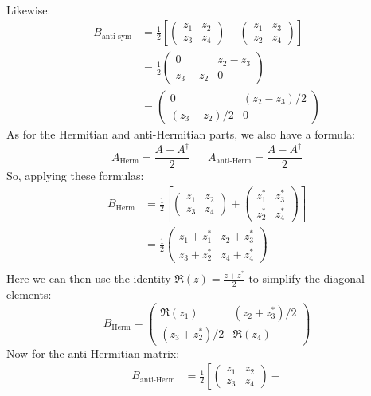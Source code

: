 \documentclass{article}
\begin{document}
\begin{solution}
\begin{align*}
	\end{align*} 
	Likewise: 
	\begin{align*}
		B_{\text{anti-sym}} &= \frac{1}{2}\left[ \begin{pmatrix} z_1 & z_2\\ z_3 & z_4 \end{pmatrix} -
		\begin{pmatrix} z_1 & z_3 \\ z_2 & z_4 \end{pmatrix}\right] \\
							&= \frac{1}{2}\begin{pmatrix} 0 & z_2 - z_3\\ z_3 - z_2& 0 \end{pmatrix}  \\
							&= \begin{pmatrix} 0 & (z_2 - z_3) / 2 \\ (z_3 - z_2) / 2 & 0\end{pmatrix}
	\end{align*}
	As for the Hermitian and anti-Hermitian parts, we also have a formula: 
	\[
		A_{\text{Herm}} = \frac{A + A^\dagger}{2} \phantom{aaa} A_{\text{anti-Herm}} = \frac{A - A^\dagger}{2}
	\] 
	So, applying these formulas:
	\begin{align*}
		B_{\text{Herm}} &= \frac{1}{2}\left[\begin{pmatrix} z_1&z_2\\z_3 & z_4 \end{pmatrix} + 
		\begin{pmatrix} z_1^* & z_3^*\\ z_2^* & z_4^* \end{pmatrix}\right]  \\
			&= \frac{1}{2}\begin{pmatrix} z_1 + z_1^* & z_2 + z_3^*\\ z_3 + z_2^* & z_4 + z_4^* \end{pmatrix}  \\
	\end{align*} 
	Here we can then use the identity $\Re(z) = \frac{z + z^*}{2}$ to simplify the diagonal elements:
	\[
		B_{\text{Herm}} = \begin{pmatrix} \Re(z_1) & (z_2 + z_3^*)/2\\ (z_3 + z_2^*) / 2 & \Re(z_4) \end{pmatrix} 
	\] 
	Now for the anti-Hermitian matrix:
	\begin{align*}
		B_{\text{anti-Herm}} &= \frac{1}{2}\left[\begin{pmatrix} z_1&z_2\\z_3 & z_4 \end{pmatrix} - 

\end{align*}
\end{solution}
\end{document}
